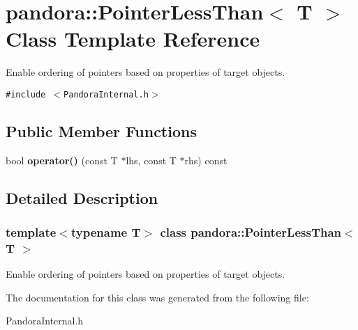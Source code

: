 \section{pandora::Pointer\-Less\-Than$<$ T $>$ Class Template Reference}
\label{classpandora_1_1PointerLessThan}
Enable ordering of pointers based on properties of target objects.  


{\tt \#include $<$Pandora\-Internal.h$>$}

\subsection*{Public Member Functions}
\begin{CompactItemize}
\item 
bool \textbf{operator()} (const T $\ast$lhs, const T $\ast$rhs) const \label{classpandora_1_1PointerLessThan_318dbd4a07e538467c428815850f9682}

\end{CompactItemize}


\subsection{Detailed Description}
\subsubsection*{template$<$typename T$>$ class pandora::Pointer\-Less\-Than$<$ T $>$}

Enable ordering of pointers based on properties of target objects. 



The documentation for this class was generated from the following file:\begin{CompactItemize}
\item 
Pandora\-Internal.h\end{CompactItemize}
